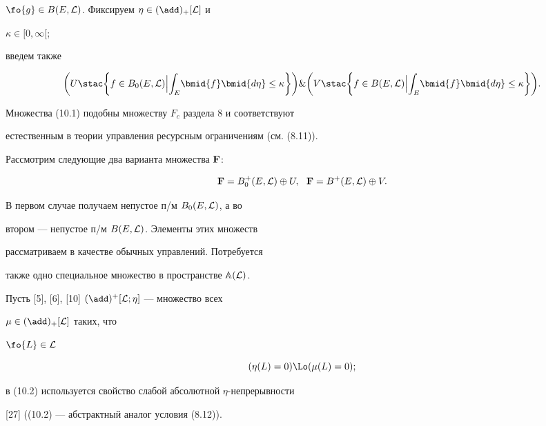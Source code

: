$\fo{g} \in B(E,{\cal L})$. Фиксируем $\eta \in {(\add)_+}[{\cal L}]$ и


$\kappa \in [0,\infty[$;


введем также


\begin{equation}


\bigg(U \stac \bigg\{f \in {B_0}(E,{\cal L})\Big|


{\int_E}\bmid{f}\bmid{d\eta} \le


\kappa\bigg\}\bigg) \& \bigg(V \stac \bigg\{f \in B(E,{\cal L}) \Big|


{\int_E}\bmid{f}\bmid{d\eta} \le \kappa\bigg\}\bigg).


\end{equation}





Множества (10.1) подобны множеству $F_c$ раздела 8 и соответствуют


естественным в теории управления ресурсным ограничениям (см. (8.11)).


Рассмотрим следующие два варианта множества ${\bold F}$:


$$


{\bold F} = {B_0^+}(E,{\cal L}) \oplus U,\ \ {\bold F} =


{B^+}(E,{\cal L}) \oplus V.


$$


В первом случае получаем непустое п/м ${B_0}(E,{\cal L})$, а во


втором --- непустое п/м $B(E,{\cal L})$. Элементы этих множеств


рассматриваем в качестве обычных управлений. Потребуется


также одно специальное множество в пространстве ${{\Bbb A}({\cal L})}$.


Пусть [5], [6], [10] ${(\add)^+}[{\cal L};\eta]$ --- множество всех


$\mu \in {(\add)_+}[{\cal L}]$ таких, что


$\fo{L} \in {\cal L}$


\begin{equation}


({{\eta}(L)} = 0) \Lo ({{\mu}(L)} = 0);


\end{equation}


в (10.2) используется свойство слабой абсолютной $\eta$-непрерывности


[27] ((10.2) --- абстрактный аналог условия (8.12)).


